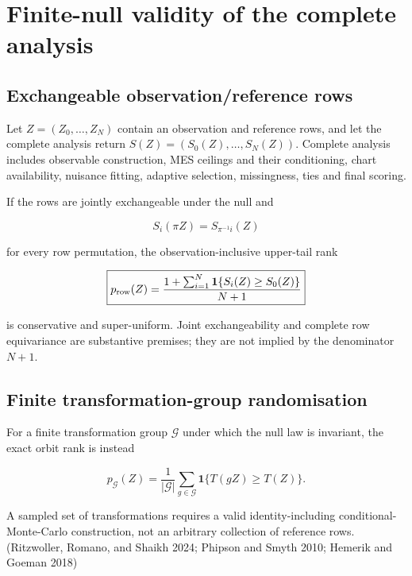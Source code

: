 \documentclass[
  11pt,
  a4paper]{article}
\begin{document}
\hypertarget{finite-null-validity-of-the-complete-analysis}{%
\section{Finite-null validity of the complete analysis}\label{finite-null-validity-of-the-complete-analysis}}

\hypertarget{exchangeable-observationreference-rows}{%
\subsection{Exchangeable observation/reference rows}\label{exchangeable-observationreference-rows}}

Let \(Z=(Z_0,\ldots,Z_N)\) contain an observation and reference rows, and let the complete analysis return \(S(Z)=(S_0(Z),\ldots,S_N(Z))\). Complete analysis includes observable construction, MES ceilings and their conditioning, chart availability, nuisance fitting, adaptive selection, missingness, ties and final scoring.

If the rows are jointly exchangeable under the null and

\[
S_i(\pi Z)=S_{\pi^{-1}i}(Z)
\]

for every row permutation, the observation-inclusive upper-tail rank

\[
\boxed{
p_{\rm row}(Z)=
\frac{1+\sum_{i=1}^N\mathbf1\{S_i(Z)\ge S_0(Z)\}}{N+1}
}
\]

is conservative and super-uniform. Joint exchangeability and complete row equivariance are substantive premises; they are not implied by the denominator \(N+1\).

\hypertarget{finite-transformation-group-randomisation}{%
\subsection{Finite transformation-group randomisation}\label{finite-transformation-group-randomisation}}

For a finite transformation group \(\mathcal G\) under which the null law is invariant, the exact orbit rank is instead

\[
\boxed{
p_{\mathcal G}(Z)=\frac1{|\mathcal G|}
\sum_{g\in\mathcal G}\mathbf1\{T(gZ)\ge T(Z)\}.
}
\]

A sampled set of transformations requires a valid identity-including conditional-Monte-Carlo construction, not an arbitrary collection of reference rows. (Ritzwoller, Romano, and Shaikh 2024; Phipson and Smyth 2010; Hemerik and Goeman 2018)
\end{document}
